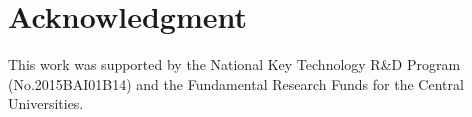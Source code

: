 \documentclass[conference]{IEEEtran}
\begin{document}
\section*{Acknowledgment}
This work was supported by the National Key Technology R\&D Program (No.2015BAI01B14) and the Fundamental Research Funds for the Central Universities.


\end{document}
